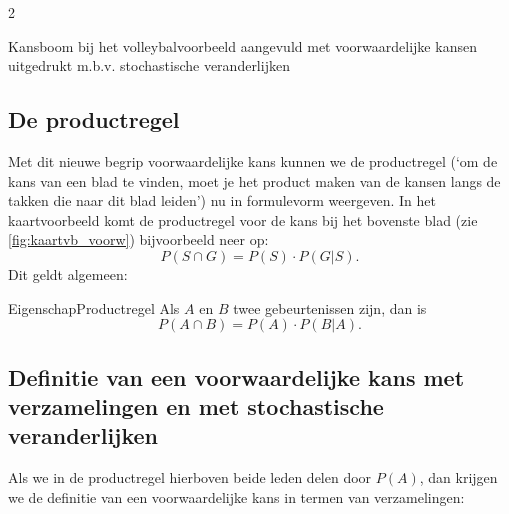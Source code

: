 \begin{multicols} {2}
\begin{afbeeldingenv}
\caption{Kansboom bij het volleybalvoorbeeld aangevuld met voorwaardelijke kansen uitgedrukt m.b.v. stochastische veranderlijken}
\label{fig:volleybal_sv_voorw}
\end{afbeeldingenv}

\subsection*{De productregel}
Met dit nieuwe begrip voorwaardelijke kans kunnen we de productregel (‘om de kans van een blad te vinden, moet je het product maken van de kansen langs de takken die naar dit blad leiden’) nu in formulevorm weergeven. In het kaartvoorbeeld komt de productregel voor de kans bij het bovenste blad (zie \autoref{fig:kaartvb_voorw}) bijvoorbeeld neer op:
$$P(S \cap G)=P(S) \cdot P(G|S).$$
Dit geldt algemeen: 
\begin{kader}{Eigenschap}{Productregel}
Als $A$ en $B$ twee gebeurtenissen zijn, dan is
$$P(A \cap B)=P(A) \cdot P(B|A).$$
\end{kader}

\subsection*{Definitie van een voorwaardelijke kans met verzamelingen en met stochastische veranderlijken}

Als we in de productregel hierboven beide leden delen door $P(A)$, dan krijgen we de definitie van een voorwaardelijke kans in termen van verzamelingen:


\end{multicols}
